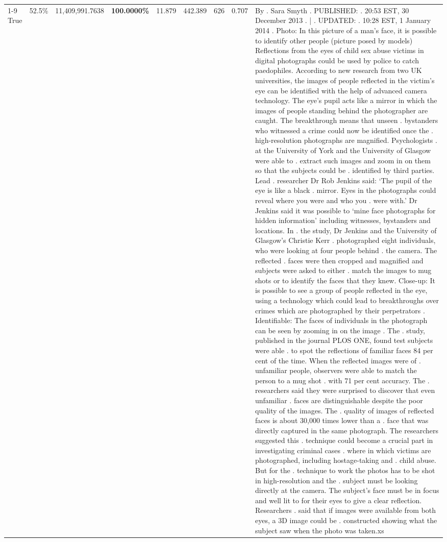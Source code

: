 \begin{table}[H]
\begin{tabular}{lllrlllll}
\cline{1-9}
True & 52.5\% & 11,409,991.7638 & \bfseries \color{red} 100.0000\% & 11.879 & 442.389 & 626 & 0.707 & By . Sara Smyth . PUBLISHED: . 20:53 EST, 30 December 2013 . | . UPDATED: . 10:28 EST, 1 January 2014 . Photo: In this picture of a man's face, it is possible to identify other people (picture posed by models) Reflections from the eyes of child sex abuse victims in digital photographs could be used by police to catch paedophiles. According to new research from two UK universities, the images of people reflected in the victim's eye can be identified with the help of advanced camera technology. The eye's pupil acts like a mirror in which the images of people standing behind the photographer are caught. The breakthrough means that unseen . bystanders who witnessed a crime could now be identified once the . high-resolution photographs are magnified. Psychologists . at the University of York and the University of Glasgow were able to . extract such images and zoom in on them so that the subjects could be . identified by third parties. Lead . researcher Dr Rob Jenkins said: ‘The pupil of the eye is like a black . mirror. Eyes in the photographs could reveal where you were and who you . were with.' Dr Jenkins said it was possible to ‘mine face photographs for hidden information' including witnesses, bystanders and locations. In . the study, Dr Jenkins and the University of Glasgow's Christie Kerr . photographed eight individuals, who were looking at four people behind . the camera. The reflected . faces were then cropped and magnified and subjects were asked to either . match the images to mug shots or to identify the faces that they knew. Close-up: It is possible to see a group of people reflected in the eye, using a technology which could lead to breakthroughs over crimes which are photographed by their perpetrators . Identifiable: The faces of individuals in the photograph can be seen by zooming in on the image . The . study, published in the journal PLOS ONE, found test subjects were able . to spot the reflections of familiar faces 84 per cent of the time. When the reflected images were of . unfamiliar people, observers were able to match the person to a mug shot . with 71 per cent accuracy. The . researchers said they were surprised to discover that even unfamiliar . faces are distinguishable despite the poor quality of the images. The . quality of images of reflected faces is about 30,000 times lower than a . face that was directly captured in the same photograph. The researchers suggested this . technique could become a crucial part in investigating criminal cases . where in which victims are photographed, including hostage-taking and . child abuse. But for the . technique to work the photos has to be shot in high-resolution and the . subject must be looking directly at the camera. The subject's face must be in focus and well lit to for their eyes to give a clear reflection. Researchers . said that if images were available from both eyes, a 3D image could be . constructed showing what the subject saw when the photo was taken.xs \\

\end{tabular}
\end{table}

